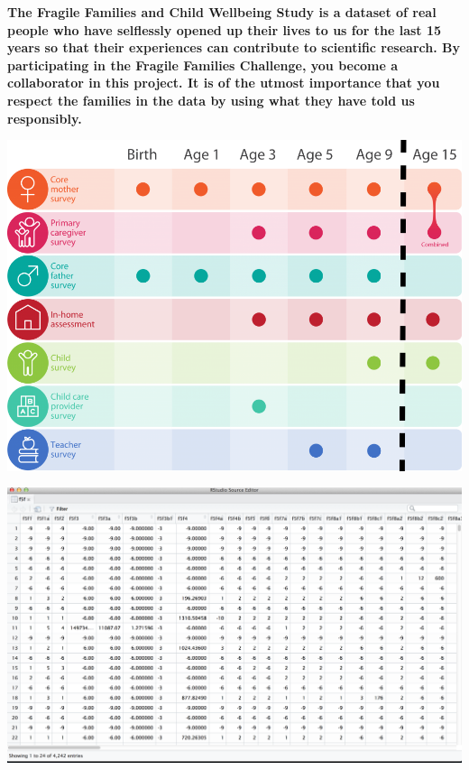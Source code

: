 \documentclass{beamer}
\begin{document}
\begin{frame}

\textbf{The Fragile Families and Child Wellbeing Study is a dataset of real people who have selflessly opened up their lives to us for the last 15 years so that their experiences can contribute to scientific research. By participating in the Fragile Families Challenge, you become a collaborator in this project. It is of the utmost importance that you respect the families in the data by using what they have told us responsibly.}

\end{frame}
\begin{frame}

\begin{center}
\includegraphics[width=\textwidth]{figures/ff_design_public2}
\end{center}

\end{frame}
\begin{frame}

\begin{center}
\includegraphics[width=\textwidth]{figures/ffc_rawdata_f5f}
\end{center}

\end{frame}
\end{document}
